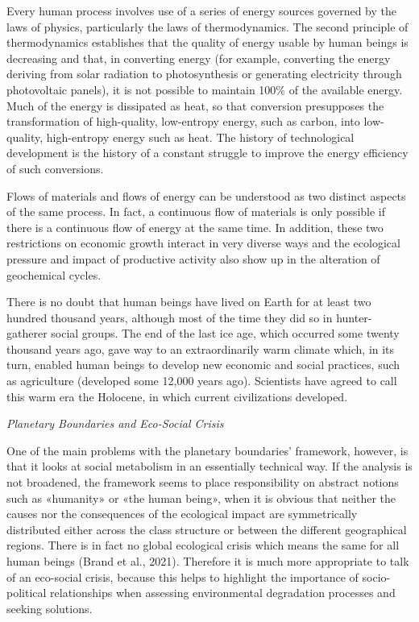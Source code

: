 \documentclass[
]{book}
\begin{document}
Every human process involves use of a series of energy sources governed by the laws of physics, particularly the laws of thermodynamics. The second principle of thermodynamics establishes that the quality of energy usable by human beings is decreasing and that, in converting energy (for example, converting the energy deriving from solar radiation to photosynthesis or generating electricity through photovoltaic panels), it is not possible to maintain 100\% of the available energy. Much of the energy is dissipated as heat, so that conversion presupposes the transformation of high-quality, low-entropy energy, such as carbon, into low-quality, high-entropy energy such as heat. The history of technological development is the history of a constant struggle to improve the energy efficiency of such conversions.

Flows of materials and flows of energy can be understood as two distinct aspects of the same process. In fact, a continuous flow of materials is only possible if there is a continuous flow of energy at the same time. In addition, these two restrictions on economic growth interact in very diverse ways and the ecological pressure and impact of productive activity also show up in the alteration of geochemical cycles.

There is no doubt that human beings have lived on Earth for at least two hundred thousand years, although most of the time they did so in hunter-gatherer social groups. The end of the last ice age, which occurred some twenty thousand years ago, gave way to an extraordinarily warm climate which, in its turn, enabled human beings to develop new economic and social practices, such as agriculture (developed some 12,000 years ago). Scientists have agreed to call this warm era the Holocene, in which current civilizations developed.

\emph{Planetary Boundaries and Eco-Social Crisis}

One of the main problems with the planetary boundaries' framework, however, is that it looks at social metabolism in an essentially technical way. If the analysis is not broadened, the framework seems to place responsibility on abstract notions such as «humanity» or «the human being», when it is obvious that neither the causes nor the consequences of the ecological impact are symmetrically distributed either across the class structure or between the different geographical regions. There is in fact no global ecological crisis which means the same for all human beings (Brand et al., 2021). Therefore it is much more appropriate to talk of an eco-social crisis, because this helps to highlight the importance of socio-political relationships when assessing environmental degradation processes and seeking solutions.
\end{document}
